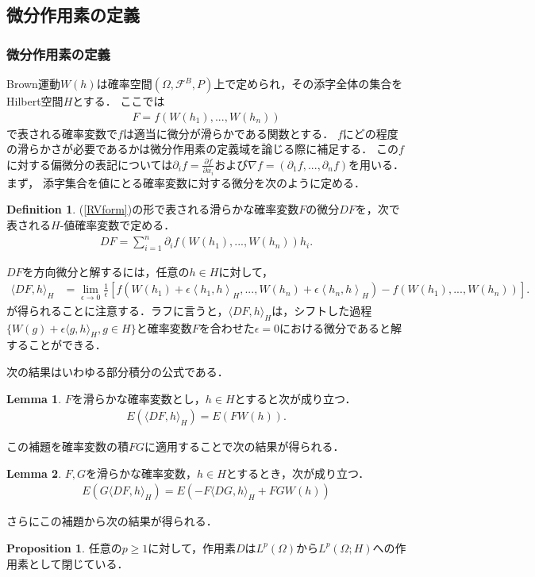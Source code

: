 \documentclass[a4paper,10pt]{jsarticle}
\theoremstyle{definition}
\newtheorem{definition}{Definition}
\newtheorem{lemma}{Lemma}
\newtheorem{proposition}{Proposition}
\newcommand{\eq}[1]{\begin{align}#1\end{align}}
\begin{document}
\subsection{微分作用素の定義}
\subsubsection{微分作用素の定義}
Brown運動$W(h)$は確率空間$(\Omega,\mathcal{F}^B,P)$上で定められ，その添字全体の集合をHilbert空間$H$とする．
ここでは
\eq{F=f(W(h_1),...,W(h_n))\label{RVform}}
で表される確率変数で$f$は適当に微分が滑らかである関数とする．
$f$にどの程度の滑らかさが必要であるかは微分作用素の定義域を論じる際に補足する．
この$f$に対する偏微分の表記については$\partial_if=\frac{\partial f}{\partial x_i}$および$\nabla f=(\partial_1f,...,\partial_nf)$を用いる．
まず，
添字集合を値にとる確率変数に対する微分を次のように定める．
\begin{definition}
(\ref{RVform})の形で表される滑らかな確率変数$F$の微分$DF$を，次で表される$H$-値確率変数で定める．
\eq{DF=\sum_{i=1}^n\partial_if(W(h_1),...,W(h_n))h_i.}
\end{definition}
$DF$を方向微分と解するには，任意の$h\in H$に対して，
\eq{\langle DF,h\rangle_H
	&=\lim_{\epsilon\rightarrow0}\frac{1}{\epsilon}\left[f(W(h_1)+\epsilon\left\langle h_1,h\right\rangle_H,...,W(h_n)+\epsilon\left\langle h_n,h\right\rangle_H)-f(W(h_1),...,W(h_n))\right].}
が得られることに注意する．ラフに言うと，$\langle DF,h\rangle_H$は，シフトした過程$\{W(g)+\epsilon\langle g,h\rangle_H,g\in H\}$と確率変数$F$を合わせた$\epsilon=0$における微分であると解することができる．

次の結果はいわゆる部分積分の公式である．
\begin{lemma}\label{lem1.2.1}
$F$を滑らかな確率変数とし，$h\in H$とすると次が成り立つ．
\eq{E\left(\langle DF,h\rangle_H\right)=E\left(FW(h)\right).}
\end{lemma}
この補題を確率変数の積$FG$に適用することで次の結果が得られる．
\begin{lemma}\label{lem1.2.2}
$F,G$を滑らかな確率変数，$h\in H$とするとき，次が成り立つ．
\eq{E\left(G\langle DF,h\rangle_H\right)=E\left(-F\langle DG,h\rangle_H+FGW(h)\right)}
\end{lemma}
さらにこの補題から次の結果が得られる．
\begin{proposition}\label{prop1.2.1}
任意の$p\ge1$に対して，作用素$D$は$L^p(\Omega)$から$L^p(\Omega;H)$への作用素として閉じている．
\end{proposition}
\end{document}
